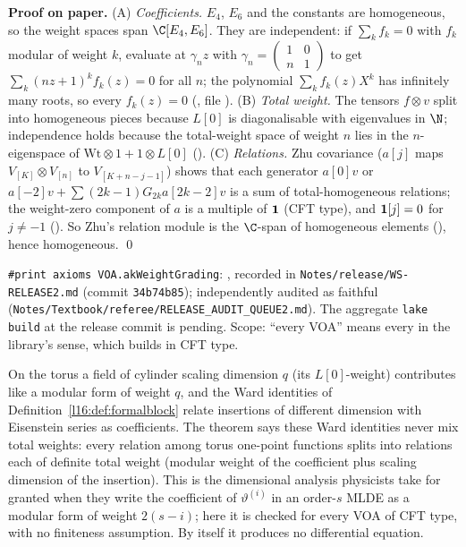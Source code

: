 \textbf{Proof on paper.} (A) \emph{Coefficients.} $E_4$, $E_6$ and the constants are homogeneous, so the weight spaces
span $\C[E_4,E_6]$. They are independent: if $\sum_kf_k=0$ with $f_k$ modular of weight $k$, evaluate at
$\gamma_n z$ with $\gamma_n=\left(\begin{smallmatrix}1&0\\n&1\end{smallmatrix}\right)$ to get
$\sum_k(nz+1)^kf_k(z)=0$ for all $n$; the polynomial $\sum_kf_k(z)X^k$ has infinitely many roots, so every $f_k(z)=0$
(, file ). (B) \emph{Total weight.} The tensors
$f\otimes v$ split into homogeneous pieces because $L[0]$ is diagonalisable with eigenvalues in $\N$; independence holds
because the total-weight space of weight $n$ lies in the $n$-eigenspace of $\mathrm{Wt}\otimes1+1\otimes L[0]$
(). (C) \emph{Relations.} Zhu covariance ($a[j]$ maps $V_{[K]}\otimes V_{[n]}$ to
$V_{[K+n-j-1]}$) shows that each generator $a[0]v$ or $a[-2]v+\sum(2k-1)G_{2k}a[2k-2]v$ is a sum of total-homogeneous
relations; the weight-zero component of $a$ is a multiple of $\mathbf{1}$ (CFT type), and $\mathbf{1}[j]=0$ for $j\neq-1$
(). So Zhu's relation module is the $\C$-span of homogeneous elements
(), hence homogeneous. \qed

\begin{status}
\texttt{\#print axioms VOA.akWeightGrading}: \lean{[propext, Classical.}\allowbreak{}\allowbreak\lean{sound]},
recorded in \texttt{Notes/\allowbreak release/\allowbreak WS-RELEASE2.md} (commit \texttt{34b74b85}); independently
audited as faithful (\texttt{Notes/\allowbreak Textbook/\allowbreak referee/\allowbreak RELEASE\_AUDIT\_QUEUE2.md}).
The aggregate \texttt{lake build} at the release commit is pending. Scope: ``every VOA'' means every
 in the library's sense, which builds in CFT type.
\end{status}

\begin{physics}
On the torus a field of cylinder scaling dimension $q$ (its $L[0]$-weight) contributes like a modular form of weight $q$,
and the Ward identities of Definition~\ref{l16:def:formalblock} relate insertions of different dimension with Eisenstein
series as coefficients. The theorem says these Ward identities never mix total weights: every relation among torus
one-point functions splits into relations each of definite total weight (modular weight of the coefficient plus scaling
dimension of the insertion). This is the dimensional analysis physicists take for granted when they write the
coefficient of $\vartheta^{(i)}$ in an order-$s$ MLDE as a modular form of weight $2(s-i)$; here it is checked for every
VOA of CFT type, with no finiteness assumption. By itself it produces no differential equation.
\end{physics}

